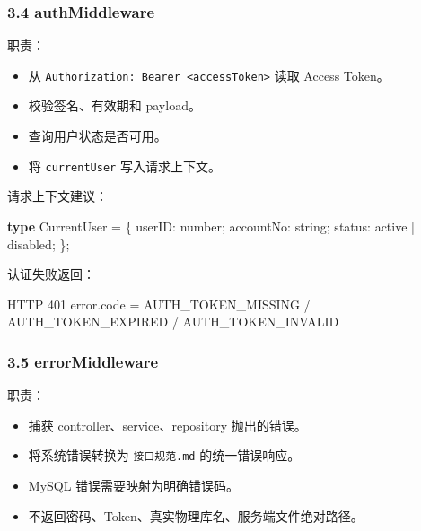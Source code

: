 \documentclass[
  a4paper,
  UTF8]{ctexart}
\newenvironment{Shaded}{}{}
\newcommand{\DataTypeTok}[1]{\textcolor[rgb]{0.56,0.13,0.00}{#1}}
\newcommand{\KeywordTok}[1]{\textcolor[rgb]{0.00,0.44,0.13}{\textbf{#1}}}
\newcommand{\NormalTok}[1]{#1}
\newcommand{\OperatorTok}[1]{\textcolor[rgb]{0.40,0.40,0.40}{#1}}
\newcommand{\StringTok}[1]{\textcolor[rgb]{0.25,0.44,0.63}{#1}}
\providecommand{\tightlist}{%
  \setlength{\itemsep}{0pt}\setlength{\parskip}{0pt}}
\begin{document}
\hypertarget{authmiddleware}{%
\subsubsection{3.4 authMiddleware}\label{authmiddleware}}

职责：

\begin{itemize}
\tightlist
\item
  从
  \texttt{Authorization:\ Bearer\ \textless{}accessToken\textgreater{}}
  读取 Access Token。
\item
  校验签名、有效期和 payload。
\item
  查询用户状态是否可用。
\item
  将 \texttt{currentUser} 写入请求上下文。
\end{itemize}

请求上下文建议：

\begin{Shaded}
\begin{Highlighting}[]
\KeywordTok{type}\NormalTok{ CurrentUser }\OperatorTok{=}\NormalTok{ \{}
\NormalTok{  userID}\OperatorTok{:} \DataTypeTok{number}\OperatorTok{;}
\NormalTok{  accountNo}\OperatorTok{:} \DataTypeTok{string}\OperatorTok{;}
\NormalTok{  status}\OperatorTok{:} \StringTok{\textquotesingle{}active\textquotesingle{}} \OperatorTok{|} \StringTok{\textquotesingle{}disabled\textquotesingle{}}\OperatorTok{;}
\NormalTok{\}}\OperatorTok{;}
\end{Highlighting}
\end{Shaded}

认证失败返回：

\begin{Shaded}
\begin{Highlighting}[]
\NormalTok{HTTP 401}
\NormalTok{error.code = AUTH\_TOKEN\_MISSING / AUTH\_TOKEN\_EXPIRED / AUTH\_TOKEN\_INVALID}
\end{Highlighting}
\end{Shaded}

\hypertarget{errormiddleware}{%
\subsubsection{3.5 errorMiddleware}\label{errormiddleware}}

职责：

\begin{itemize}
\tightlist
\item
  捕获 controller、service、repository 抛出的错误。
\item
  将系统错误转换为 \texttt{接口规范.md} 的统一错误响应。
\item
  MySQL 错误需要映射为明确错误码。
\item
  不返回密码、Token、真实物理库名、服务端文件绝对路径。
\end{itemize}
\end{document}
